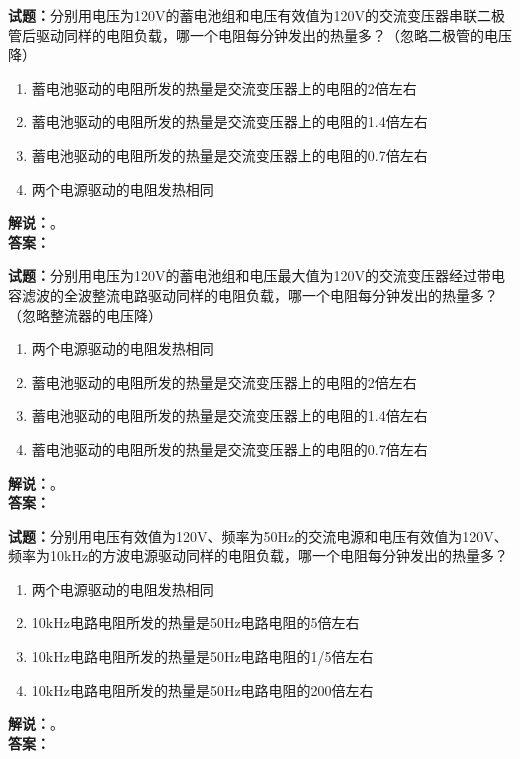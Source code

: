 \documentclass{ctexbook}
\begin{document}
\noindent\textbf{试题：}分别用电压为120V的蓄电池组和电压有效值为120V的交流变压器串联二极管后驱动同样的电阻负载，哪一个电阻每分钟发出的热量多？（忽略二极管的电压降）
\begin{enumerate}[leftmargin=3em]
  \item 蓄电池驱动的电阻所发的热量是交流变压器上的电阻的2倍左右
  \item 蓄电池驱动的电阻所发的热量是交流变压器上的电阻的1.4倍左右
  \item 蓄电池驱动的电阻所发的热量是交流变压器上的电阻的0.7倍左右
  \item 两个电源驱动的电阻发热相同
\end{enumerate}
\noindent\textbf{解说：}\textbf{}。\\\noindent\textbf{答案：}

\vspace{\baselineskip}

\noindent\textbf{试题：}分别用电压为120V的蓄电池组和电压最大值为120V的交流变压器经过带电容滤波的全波整流电路驱动同样的电阻负载，哪一个电阻每分钟发出的热量多？（忽略整流器的电压降）
\begin{enumerate}[leftmargin=3em]
  \item 两个电源驱动的电阻发热相同
  \item 蓄电池驱动的电阻所发的热量是交流变压器上的电阻的2倍左右
  \item 蓄电池驱动的电阻所发的热量是交流变压器上的电阻的1.4倍左右
  \item 蓄电池驱动的电阻所发的热量是交流变压器上的电阻的0.7倍左右
\end{enumerate}
\noindent\textbf{解说：}\textbf{}。\\\noindent\textbf{答案：}

\vspace{\baselineskip}

\noindent\textbf{试题：}分别用电压有效值为120V、频率为50Hz的交流电源和电压有效值为120V、频率为10\unit{\kHz}的方波电源驱动同样的电阻负载，哪一个电阻每分钟发出的热量多？
\begin{enumerate}[leftmargin=3em]
  \item 两个电源驱动的电阻发热相同
  \item 10\unit{\kHz}电路电阻所发的热量是50Hz电路电阻的5倍左右
  \item 10\unit{\kHz}电路电阻所发的热量是50Hz电路电阻的1/5倍左右
  \item 10\unit{\kHz}电路电阻所发的热量是50Hz电路电阻的200倍左右
\end{enumerate}
\noindent\textbf{解说：}\textbf{}。\\\noindent\textbf{答案：}
\end{document}
